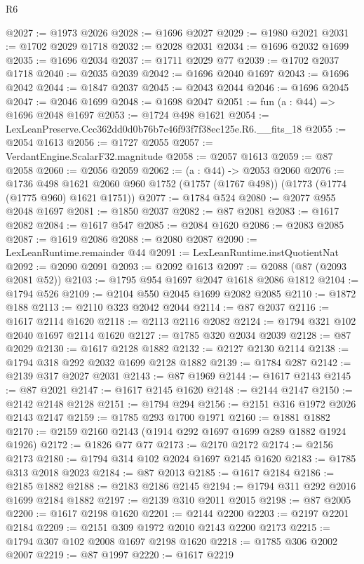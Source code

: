 \begin{lexlean}{R6}
\begin{coremodule}
@2027 := @1973 @2026
@2028 := @1696 @2027
@2029 := @1980 @2021
@2031 := @1702 @2029 @1718
@2032 := @2028 @2031
@2034 := @1696 @2032 @1699
@2035 := @1696 @2034
@2037 := @1711 @2029 @77
@2039 := @1702 @2037 @1718
@2040 := @2035 @2039
@2042 := @1696 @2040 @1697
@2043 := @1696 @2042
@2044 := @1847 @2037
@2045 := @2043 @2044
@2046 := @1696 @2045
@2047 := @2046 @1699
@2048 := @1698 @2047
@2051 := fun (a : @44) => @1696 @2048 @1697
@2053 := @1724 @498 @1621
@2054 := LexLeanPreserve.Ccc362dd0d0b76b7c46f93f7f38ec125e.R6.__fits_18
@2055 := @2054 @1613
@2056 := @1727 @2055
@2057 := VerdantEngine.ScalarF32.magnitude
@2058 := @2057 @1613
@2059 := @87 @2058
@2060 := @2056 @2059
@2062 := (a : @44) -> @2053 @2060
@2076 := @1736
    @498
    @1621
    @2060
    @960
    @1752
    (@1757 (@1767 @498))
    (@1773 (@1774 (@1775 @960) @1621 @1751))
@2077 := @1784 @524
@2080 := @2077 @955 @2048 @1697
@2081 := @1850 @2037
@2082 := @87 @2081
@2083 := @1617 @2082
@2084 := @1617 @547
@2085 := @2084 @1620
@2086 := @2083 @2085
@2087 := @1619 @2086
@2088 := @2080 @2087
@2090 := LexLeanRuntime.remainder @44
@2091 := LexLeanRuntime.instQuotientNat
@2092 := @2090 @2091
@2093 := @2092 @1613
@2097 := @2088 (@87 (@2093 @2081 @52))
@2103 := @1795 @954 @1697 @2047 @1618 @2086 @1812
@2104 := @1794 @526
@2109 := @2104 @550 @2045 @1699 @2082 @2085
@2110 := @1872 @188
@2113 := @2110 @323 @2042 @2044
@2114 := @87 @2037
@2116 := @1617 @2114 @1620
@2118 := @2113 @2116 @2082
@2124 := @1794 @321 @102 @2040 @1697 @2114 @1620
@2127 := @1785 @320 @2034 @2039
@2128 := @87 @2029
@2130 := @1617 @2128 @1882
@2132 := @2127 @2130 @2114
@2138 := @1794 @318 @292 @2032 @1699 @2128 @1882
@2139 := @1784 @287
@2142 := @2139 @317 @2027 @2031
@2143 := @87 @1969
@2144 := @1617 @2143
@2145 := @87 @2021
@2147 := @1617 @2145 @1620
@2148 := @2144 @2147
@2150 := @2142 @2148 @2128
@2151 := @1794 @294
@2156 := @2151 @316 @1972 @2026 @2143 @2147
@2159 := @1785 @293 @1700 @1971
@2160 := @1881 @1882
@2170 := @2159 @2160 @2143 (@1914 @292 @1697 @1699 @289 @1882 @1924 @1926)
@2172 := @1826 @77 @77
@2173 := @2170 @2172
@2174 := @2156 @2173
@2180 := @1794 @314 @102 @2024 @1697 @2145 @1620
@2183 := @1785 @313 @2018 @2023
@2184 := @87 @2013
@2185 := @1617 @2184
@2186 := @2185 @1882
@2188 := @2183 @2186 @2145
@2194 := @1794 @311 @292 @2016 @1699 @2184 @1882
@2197 := @2139 @310 @2011 @2015
@2198 := @87 @2005
@2200 := @1617 @2198 @1620
@2201 := @2144 @2200
@2203 := @2197 @2201 @2184
@2209 := @2151 @309 @1972 @2010 @2143 @2200 @2173
@2215 := @1794 @307 @102 @2008 @1697 @2198 @1620
@2218 := @1785 @306 @2002 @2007
@2219 := @87 @1997
@2220 := @1617 @2219

\end{coremodule}
\end{lexlean}
